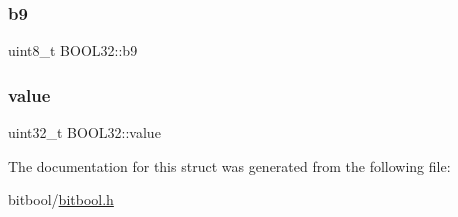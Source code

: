 \subsubsection{\texorpdfstring{b9}{b9}}
{\footnotesize\ttfamily uint8\+\_\+t B\+O\+O\+L32\+::b9}

\hypertarget{struct_b_o_o_l32_af4c721aad4bfef99160e40d6dabd044f}{}\label{struct_b_o_o_l32_af4c721aad4bfef99160e40d6dabd044f} 
\subsubsection{\texorpdfstring{value}{value}}
{\footnotesize\ttfamily uint32\+\_\+t B\+O\+O\+L32\+::value}



The documentation for this struct was generated from the following file\+:\begin{DoxyCompactItemize}
\item 
bitbool/\hyperlink{bitbool_8h}{bitbool.\+h}\end{DoxyCompactItemize}
